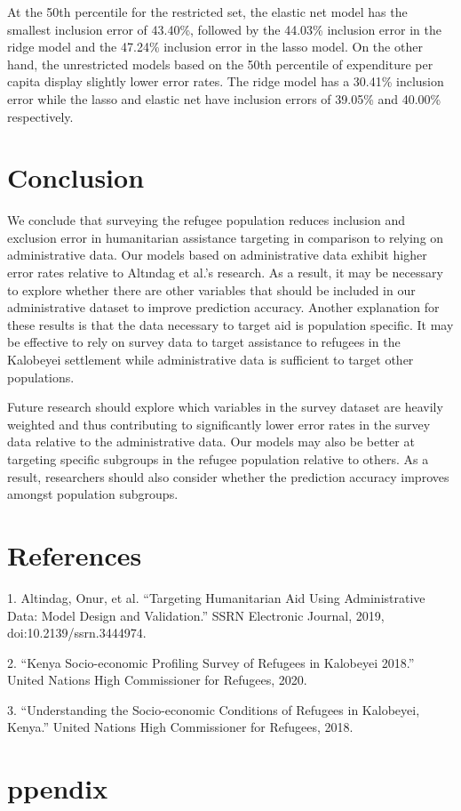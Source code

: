\documentclass{article}
\begin{document}


At the 50th percentile for the restricted set, the elastic net model has the smallest inclusion error of 43.40\%, followed by the 44.03\% inclusion error in the ridge model and the 47.24\% inclusion error in the lasso model. On the other hand, the unrestricted models based on the 50th percentile of expenditure per capita display slightly lower error rates. The ridge model has a 30.41\% inclusion error while the lasso and elastic net have inclusion errors of 39.05\% and 40.00\% respectively.

\section{Conclusion}

We conclude that surveying the refugee population reduces inclusion and exclusion error in humanitarian assistance targeting in comparison to relying on administrative data. Our models based on administrative data exhibit higher error rates relative to Altındag et al.’s research. As a result, it may be necessary to explore whether there are other variables that should be included in our administrative dataset to improve prediction accuracy. Another explanation for these results is that the data necessary to target aid is population specific. It may be effective to rely on survey data to target assistance to refugees in the Kalobeyei settlement while administrative data is sufficient to target other populations.

Future research should explore which variables in the survey dataset are heavily weighted and thus contributing to significantly lower error rates in the survey data relative to the administrative data. Our models may also be better at targeting specific subgroups in the refugee population relative to others. As a result, researchers should also consider whether the prediction accuracy improves amongst population subgroups. 



 \newpage
 \section{References}

1. Altindag, Onur, et al. “Targeting Humanitarian Aid Using Administrative Data: Model Design and Validation.” SSRN Electronic Journal, 2019, doi:10.2139/ssrn.3444974.

2. “Kenya Socio-economic Profiling Survey of Refugees in Kalobeyei 2018.” United Nations High Commissioner for Refugees, 2020.

3. “Understanding the Socio-economic Conditions of Refugees in Kalobeyei, Kenya.” United Nations High Commissioner for Refugees, 2018.  

\newpage
\appendix

\renewcommand\thefigure{\thesection.\arabic{table}} 

\section{ppendix}
\setcounter{table}{0}





\end{document}
